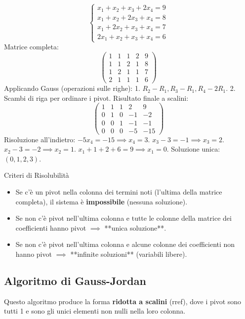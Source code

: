 \begin{exercisebox}[title={Esempio Non Omogeneo}]
$$
\begin{cases}
x_1 + x_2 + x_3 + 2x_4 = 9\\
x_1 + x_2 + 2x_3 + x_4 = 8\\
x_1 + 2x_2 + x_3 + x_4 = 7\\
2x_1 + x_2 + x_3 + x_4 = 6
\end{cases}
$$
Matrice completa:
$$
\begin{pmatrix}
1 & 1 & 1 & 2 & 9\\
1 & 1 & 2 & 1 & 8\\
1 & 2 & 1 & 1 & 7\\
2 & 1 & 1 & 1 & 6
\end{pmatrix}
$$
Applicando Gauss (operazioni sulle righe):
1. $R_2-R_1, R_3-R_1, R_4-2R_1$.
2. Scambi di riga per ordinare i pivot.
Risultato finale a scalini:
$$
\begin{pmatrix}
1 & 1 & 1 & 2 & 9\\
0 & 1 & 0 & -1 & -2\\
0 & 0 & 1 & -1 & -1\\
0 & 0 & 0 & -5 & -15
\end{pmatrix}
$$
Risoluzione all'indietro:
$-5x_4 = -15 \implies x_4 = 3$.
$x_3 - 3 = -1 \implies x_3 = 2$.
$x_2 - 3 = -2 \implies x_2 = 1$.
$x_1 + 1 + 2 + 6 = 9 \implies x_1 = 0$.
Soluzione unica: $(0,1,2,3)$.
\end{exercisebox}

\begin{concept}{Criteri di Risolubilità}
\begin{itemize}
    \item Se c'è un pivot nella colonna dei termini noti (l'ultima della matrice completa), il sistema è \textbf{impossibile} (nessuna soluzione).
    \item Se non c'è pivot nell'ultima colonna e tutte le colonne della matrice dei coefficienti hanno pivot $\implies$ **unica soluzione**.
    \item Se non c'è pivot nell'ultima colonna e alcune colonne dei coefficienti non hanno pivot $\implies$ **infinite soluzioni** (variabili libere).
\end{itemize}
\end{concept}

\subsection{Algoritmo di Gauss-Jordan}
Questo algoritmo produce la forma \textbf{ridotta a scalini} (rref), dove i pivot sono tutti 1 e sono gli unici elementi non nulli nella loro colonna.

